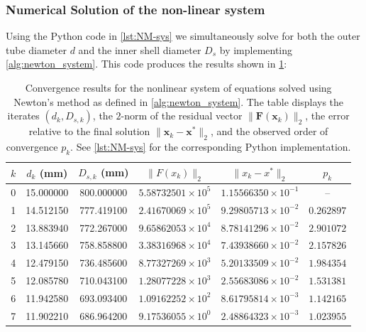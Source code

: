 \documentclass[11pt, a4paper]{article}
\theoremstyle{definition}
\begin{document}
\subsubsection{Numerical Solution of the non-linear system}
Using the Python code in \cref{lst:NM-sys} we simultaneously solve for both the outer tube diameter $d$ and the inner shell diameter $D_s$ by implementing \cref{alg:newton_system}.
This code produces the results shown in \cref{tab:newton_sys:results}:

\begin{table}[h!]

\centering
\caption{Convergence results for the nonlinear system of equations solved using Newton's method as defined in \cref{alg:newton_system}. The table displays the iterates $(d_k, D_{s,k})$, the $2$-norm of the residual vector $\lVert \mathbf{F}(\mathbf{x}_k) \rVert_2$, the error relative to the final solution $\lVert \mathbf{x}_k - \mathbf{x}^* \rVert_2$, and the observed order of convergence $p_k$. See \cref{lst:NM-sys} for the corresponding Python implementation.}
\label{tab:newton_sys:results}
\begin{tabular}{cccccc}
\hline
\textbf{$k$} & \textbf{$d_k$ (mm)} & \textbf{$D_{s,k}$ (mm)} & \textbf{$\lVert F(x_k)\rVert_2$} & \textbf{$\lVert x_k - x^*\rVert_2$} & \textbf{$p_k$} \\
\hline
 0  &  15.000000  & 800.000000  & $5.58732501\times 10^{5}$ & $1.15566350\times 10^{-1}$ & -- \\
 1  &  14.512150  & 777.419100  & $2.41670069\times 10^{5}$ & $9.29805713\times 10^{-2}$ & $0.262897$ \\
 2  &  13.883940  & 772.267000  & $9.65862053\times 10^{4}$ & $8.78141296\times 10^{-2}$ & $2.901072$ \\
 3  &  13.145660  & 758.858800  & $3.38316968\times 10^{4}$ & $7.43938660\times 10^{-2}$ & $2.157826$ \\
 4  &  12.479150  & 736.485600  & $8.77327269\times 10^{3}$ & $5.20133509\times 10^{-2}$ & $1.984354$ \\
 5  &  12.085780  & 710.043100  & $1.28077228\times 10^{3}$ & $2.55683086\times 10^{-2}$ & $1.531381$ \\
 6  &  11.942580  & 693.093400  & $1.09162252\times 10^{2}$ & $8.61795814\times 10^{-3}$ & $1.142165$ \\
 7  &  11.902210  & 686.964200  & $9.17536055\times 10^{0}$ & $2.48864323\times 10^{-3}$ & $1.023955$ \\

\end{tabular}
\end{table}
\end{document}
